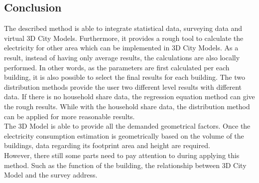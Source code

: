 \subsection{Conclusion}
The described method is able to integrate statistical data, surveying data and virtual 3D City Models. Furthermore, it provides a rough tool to calculate the electricity for other area which can be implemented in 3D City Models. As a result, instead of having only average results, the calculations are also locally performed. In other words, as the parameters are first calculated per each building, it is also possible to select the final results for each building. The two distribution methods provide the user two different level results with different data. If there is no household share data, the regression equation method can give the rough results. While with the household share data, the distribution method can be applied for more reasonable results.\\

The 3D Model is able to provide all the demanded geometrical factors. Once the electricity consumption estimation is geometrically based on the volume of the buildings, data regarding its footprint area and height are required. \\

However, there still some parts need to pay attention to during applying this method. Such as the function of the building, the relationship between 3D City Model and the survey address.
